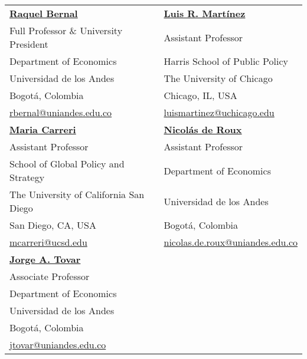 \documentclass[margin,line]{res}
\begin{document}
\begin{resume}
\begin{tabular}{p{7cm}p{7cm}}
   \href{https://sites.google.com/view/raquelbernal}{\textbf{Raquel Bernal}}                           & \href{https://sites.google.com/site/lrmartineza}{\textbf{Luis R. Martínez}}      \\
   Full Professor \& University President                & Assistant Professor            \\     
   Department of Economics                          & Harris School of Public Policy \\   
   Universidad de los Andes                         & The University of Chicago      \\
   Bogotá, Colombia                                 & Chicago, IL, USA               \\   
   \href{mailto:rbernal@uniandes.edu.co}{rbernal@uniandes.edu.co} &    \href{mailto:luismartinez@uchicago.edu}{luismartinez@uchicago.edu} \\
    \addlinespace
   \href{https://www.mariacarreri.com/}{\textbf{Maria Carreri}}                            &  \href{https://sites.google.com/site/nicoderoux/}{\textbf{Nicolás de Roux}}               \\
   Assistant Professor                               &   Assistant Professor                    \\     
   School of Global Policy and Strategy                          &  Department of Economics     \\   
   The University of California San Diego                        &  Universidad de los Andes   \\
   San Diego, CA, USA                                 &   Bogotá, Colombia                       \\      
   \href{mailto:mcarreri@ucsd.edu}{mcarreri@ucsd.edu} & \href{mailto:nicolas.de.roux@uniandes.edu.co}{nicolas.de.roux@uniandes.edu.co}   \\
   \addlinespace
   \href{https://sites.google.com/view/jorgetovar/home}{\textbf{Jorge A. Tovar}}                             &                \\
   Associate Professor                              &                      \\     
   Department of Economics                          &      \\   
   Universidad de los Andes                         &    \\
   Bogotá, Colombia                                 &                      \\      
   \href{mailto:jtovar@uniandes.edu.co}{jtovar@uniandes.edu.co} &  
\end{tabular}

\end{resume}
\end{document}
